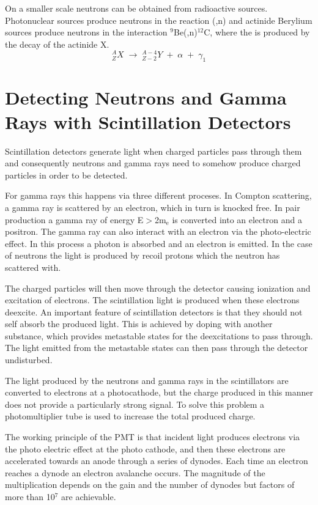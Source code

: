 \documentclass[main.tex]{subfiles}
\begin{document}
On a smaller scale neutrons can be obtained from radioactive sources. Photonuclear sources produce neutrons in the reaction (\textgamma ,n) and actinide Berylium sources produce neutrons in the interaction $^\text{9}$Be(\textalpha,n)$^\text{12}$C, where the \textalpha\;is produced by the decay of the actinide X\cite[pg.8]{Leo}.
\begin{equation}
	^A_ZX\;\rightarrow\;^{A-4}_{Z-2}Y\;+\;\alpha\;+\;\gamma_1
	\label{eq:actinide}
\end{equation}
\section{Detecting Neutrons and Gamma Rays with Scintillation Detectors}
Scintillation detectors generate light when charged particles pass through them and consequently neutrons and gamma rays need to somehow produce charged particles in order to be detected.

For gamma rays this happens via three different proceses. In Compton scattering, a gamma ray is scattered by an electron, which in turn is knocked free. In pair production a gamma ray of energy E$>$2m$_\text{e}$ is converted into an electron and a positron. The gamma ray can also interact with an electron via the photo-electric effect. In this process a photon is absorbed and an electron is emitted. In the case of neutrons the light is produced by recoil protons which the neutron has scattered with.

The charged particles will then move through the detector causing ionization and excitation of electrons. The scintillation light is produced when these electrons deexcite. An important feature of scintillation detectors is that they should not self absorb the produced light. This is achieved by doping with another substance, which provides metastable states for the deexcitations to pass through. The light emitted from the metastable states can then pass through the detector undisturbed.

The light produced by the neutrons and gamma rays in the scintillators are converted to electrons at a photocathode, but the charge produced in this manner does not provide a particularly strong signal. To solve this problem a photomultiplier tube is used to increase the total produced charge. 

The working principle of the PMT is that incident light produces electrons via the photo electric effect at the photo cathode, and then these electrons are accelerated towards an anode through a series of dynodes. Each time an electron reaches a dynode an electron avalanche occurs. The magnitude of the multiplication depends on the gain and the number of dynodes but factors of more than 10$^\text{7}$ are achievable. 
\end{document}
